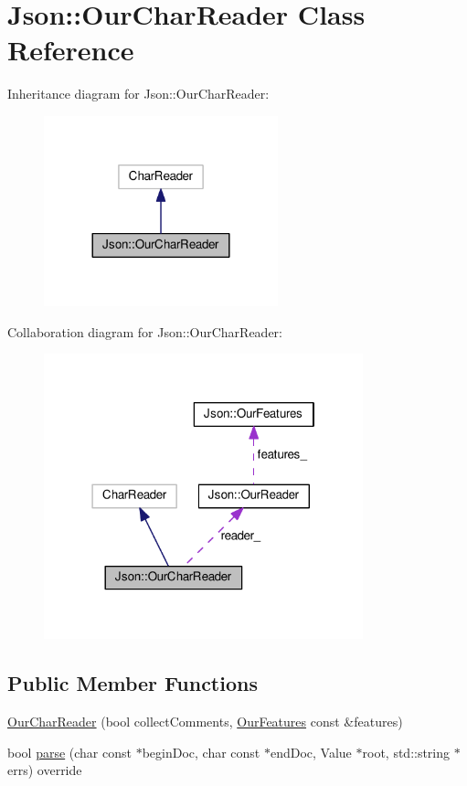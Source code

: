 \hypertarget{class_json_1_1_our_char_reader}{}\section{Json\+:\+:Our\+Char\+Reader Class Reference}
\label{class_json_1_1_our_char_reader}


Inheritance diagram for Json\+:\+:Our\+Char\+Reader\+:\nopagebreak
\begin{figure}[H]
\begin{center}
\leavevmode
\includegraphics[width=192pt]{class_json_1_1_our_char_reader__inherit__graph}
\end{center}
\end{figure}


Collaboration diagram for Json\+:\+:Our\+Char\+Reader\+:\nopagebreak
\begin{figure}[H]
\begin{center}
\leavevmode
\includegraphics[width=262pt]{class_json_1_1_our_char_reader__coll__graph}
\end{center}
\end{figure}
\subsection*{Public Member Functions}
\begin{DoxyCompactItemize}
\item 
\hyperlink{class_json_1_1_our_char_reader_a5015506620e7ba7bab417756fa1ca9fe}{Our\+Char\+Reader} (bool collect\+Comments, \hyperlink{class_json_1_1_our_features}{Our\+Features} const \&features)
\item 
bool \hyperlink{class_json_1_1_our_char_reader_a52a1fb5fee88d9b63dd462f63b1c9570}{parse} (char const $\ast$begin\+Doc, char const $\ast$end\+Doc, Value $\ast$root, std\+::string $\ast$errs) override
\end{DoxyCompactItemize}
